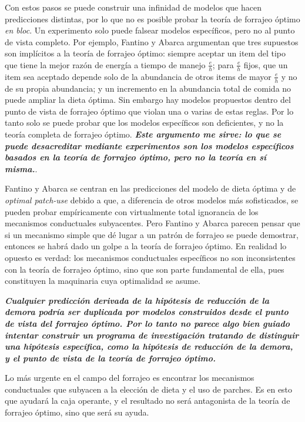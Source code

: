 \documentclass[a4paper,12pt]{article}
\begin{document}
Con estos pasos se puede construir una infinidad de modelos que hacen predicciones distintas, por lo que no es posible probar la teoría de forrajeo óptimo {\itshape en bloc}. Un experimento solo puede falsear modelos específicos, pero no al punto de vista completo. Por ejemplo, Fantino y Abarca argumentan que tres supuestos son implícitos a la teoría de forrajeo óptimo: siempre aceptar un item del tipo que tiene la mejor razón de energía a tiempo de manejo $\frac{e}{h}$; para $\frac{e}{h}$ fijos, que un item sea aceptado depende solo de la abundancia de otros items de mayor $\frac{e}{h}$ y no de su propia abundancia; y un incremento en la abundancia total de comida no puede ampliar la dieta óptima. Sin embargo hay modelos propuestos dentro del punto de vista de forrajeo óptimo que violan una o varias de estas reglas. Por lo tanto solo se puede probar que los modelos específicos son deficientes, y no la teoría completa de forrajeo óptimo. {\bfseries\itshape Este argumento me sirve: lo que se puede desacreditar mediante experimentos son los modelos específicos basados en la teoría de forrajeo óptimo, pero no la teoría en sí misma.}.

Fantino y Abarca se centran en las predicciones del modelo de dieta óptima y de {\itshape optimal patch-use} debido a que, a diferencia de otros modelos más sofisticados, se pueden probar empíricamente con virtualmente total ignorancia de los mecanismos conductuales subyacentes. Pero Fantino y Abarca parecen pensar que si un mecanismo simple que dé lugar a un patrón de forrajeo se puede demostrar, entonces se habrá dado un golpe a la teoría de forrajeo óptimo. En realidad lo opuesto es verdad: los mecanismos conductuales específicos no son inconsistentes con la teoría de forrajeo óptimo, sino que son parte fundamental de ella, pues constituyen la maquinaria cuya optimalidad se asume.

{\itshape\bfseries Cualquier predicción derivada de la hipótesis de reducción de la demora podría ser duplicada por modelos construidos desde el punto de vista del forrajeo óptimo. Por lo tanto no parece algo bien guiado intentar construir un programa de investigación tratando de distinguir una hipótesis específica, como la hipótesis de reducción de la demora, y el punto de vista de la teoría de forrajeo óptimo.}

Lo más urgente en el campo del forrajeo es encontrar los mecanismos conductuales que subyacen a la elección de dieta y el uso de parches. Es en esto que ayudará la caja operante, y el resultado no será antagonista de la teoría de forrajeo óptimo, sino que será su ayuda.
\end{document}
